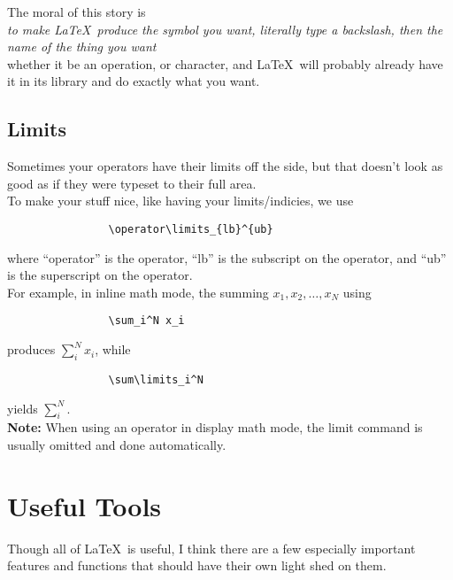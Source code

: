 \documentclass[11pt,letterpaper,twoside,titlepage]{article}
\newcommand{\latex}{\LaTeX \ }
\begin{document}
			The moral of this story is \\
			
			\emph{to make \latex produce the symbol you want, literally type a backslash, then the name of the thing you want} \\
			
			whether it be an operation, or character, and \latex will probably already have it in its library and do exactly what you want.
			
		\subsection{Limits}
		
			Sometimes your operators have their limits off the side, but that doesn't look as good as if they were typeset to their full area. \\
			
			To make your stuff nice, like having your limits/indicies, we use
			
			\begin{verbatim}
				\operator\limits_{lb}^{ub}
			\end{verbatim}
			
			where ``operator'' is the operator, ``lb'' is the subscript on the operator, and ``ub'' is the superscript on the operator. \\
			
			For example, in inline math mode, the summing $x_1, x_2, \dots, x_N$ using 
			
			\begin{verbatim}
				\sum_i^N x_i
			\end{verbatim}
			
			produces $\sum_i^N x_i$, while 
			
			\begin{verbatim}
				\sum\limits_i^N
			\end{verbatim}
			
			yields $\sum\limits_i^N$. \\
			
			\textbf{Note:} When using an operator in display math mode, the limit command is usually omitted and done automatically.
			
\newpage
	
	\section{Useful Tools}
	
		Though all of \latex is useful, I think there are a few especially important features and functions that should have their own light shed on them.
		
\end{document}
